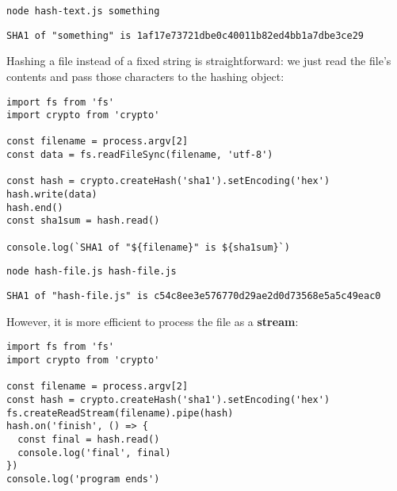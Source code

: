 \documentclass[krantzl]{krantz}
\newcommand{\glossref}[1]{\textbf{#1}}
\begin{document}
\begin{lstlisting}[frame=single,frameround=tttt]
node hash-text.js something
\end{lstlisting}



\begin{lstlisting}[frame=single,frameround=tttt]
SHA1 of "something" is 1af17e73721dbe0c40011b82ed4bb1a7dbe3ce29
\end{lstlisting}



Hashing a file instead of a fixed string is straightforward:
we just read the file's contents and pass those characters to the hashing object:


\begin{lstlisting}[frame=single,frameround=tttt]
import fs from 'fs'
import crypto from 'crypto'

const filename = process.argv[2]
const data = fs.readFileSync(filename, 'utf-8')

const hash = crypto.createHash('sha1').setEncoding('hex')
hash.write(data)
hash.end()
const sha1sum = hash.read()

console.log(`SHA1 of "${filename}" is ${sha1sum}`)
\end{lstlisting}



\begin{lstlisting}[frame=single,frameround=tttt]
node hash-file.js hash-file.js
\end{lstlisting}



\begin{lstlisting}[frame=single,frameround=tttt]
SHA1 of "hash-file.js" is c54c8ee3e576770d29ae2d0d73568e5a5c49eac0
\end{lstlisting}



However,
it is more efficient to process the file as a \glossref{stream}:


\begin{lstlisting}[frame=single,frameround=tttt]
import fs from 'fs'
import crypto from 'crypto'

const filename = process.argv[2]
const hash = crypto.createHash('sha1').setEncoding('hex')
fs.createReadStream(filename).pipe(hash)
hash.on('finish', () => {
  const final = hash.read()
  console.log('final', final)
})
console.log('program ends')
\end{lstlisting}
\end{document}
